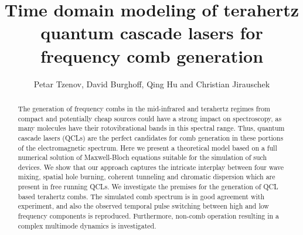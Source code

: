 \documentclass[10pt]{article}
\begin{document}
	\title{Time domain modeling of terahertz quantum cascade lasers for frequency comb generation}
	\author{Petar Tzenov, David Burghoff, Qing Hu and Christian
		Jirauschek}
	\address{Institute for Nanoelectronics, Technical University of Munich,
		D-80333 Munich, Germany} 
	\address{Department of Electrical Engineering
		and Computer Science, Research Laboratory of Electronics, Massachusetts
		Institute of Technology, Cambridge, Massachusetts 02139, USA}
	\begin{abstract}
		The generation of frequency combs in the mid-infrared and terahertz regimes
		from compact and potentially cheap sources could have a strong impact on
		spectroscopy, as many molecules have their rotovibrational bands in this
		spectral range. Thus, quantum cascade lasers (QCLs) are the perfect candidates
		for comb generation in these portions of the electromagnetic spectrum. Here we
		present a theoretical model based on a full numerical solution of
		Maxwell-Bloch equations suitable for the simulation of such devices. We show
		that our approach captures the intricate interplay between four wave mixing,
		spatial hole burning, coherent tunneling and chromatic dispersion which are
		present in free running QCLs. We investigate the premises for the generation
		of QCL based terahertz combs. The simulated comb spectrum is in good agreement
		with experiment, and also the observed temporal pulse switching between high
		and low frequency components is reproduced. Furthermore, non-comb operation
		resulting in a complex multimode dynamics is investigated.
	\end{abstract}
\end{document}
